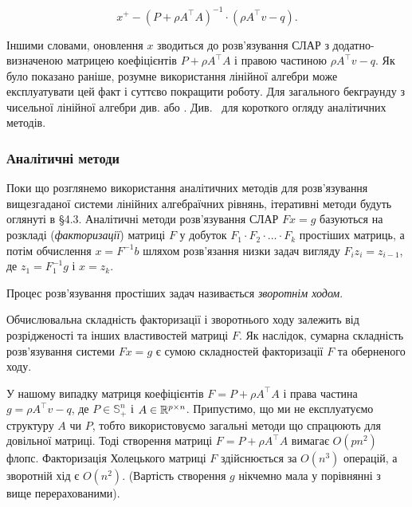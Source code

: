 \begin{equation}
	\label{eq:4.1}
	x^+ - \left(P + \rho A^\intercal A\right)^{-1} \cdot \left(\rho A^\intercal v - q\right).
\end{equation} 

Іншими словами, оновлення $x$ зводиться до розв'язування СЛАР з додатно-визначеною матрицею коефіцієнтів $P + \rho A^\intercal A$ і правою частиною $\rho A^\intercal v - q$. Як було показано раніше, розумне використання лінійної алгебри може експлуатувати цей факт і суттєво покращити роботу. Для загального бекграунду з чисельної лінійної алгебри див. \cite{47} або \cite{90}. Див.~\cite[додаток C]{20} для короткого огляду аналітичних методів.

\subsubsection{Аналітичні методи}

Поки що розглянемо використання аналітичних методів для роз\-в'яз\-у\-ван\-ня  вищезгаданої системи лінійних алгебраїчних рівнянь, ітеративні методи будуть оглянуті в \S4.3. Аналітичні методи розв'язування СЛАР $F x = g$ базуються на розкладі (\textit{факторизації}) матриці $F$ у добуток  $F_1 \cdot F_2 \cdot \ldots \cdot F_k$ простіших матриць, а потім обчислення  $x = F^{-1} b$ шляхом розв'язання низки задач вигляду $F_i z_i = z_{i - 1}$, де $z_1 = F_1^{-1} g$ і $x = z_k$. 

\begin{definition}
	Процес розв'язування простіших задач називається \textit{зворотнім ходом}.
\end{definition}

Обчислювальна складність факторизації і зворотнього ходу залежить від розрідженості та інших властивостей матриці $F$. Як наслідок, сумарна складність розв'язування системи $F x = g$ є сумою складностей факторизації $F$ та оберненого ходу. \medskip

У нашому випадку матриця коефіцієнтів $F = P + \rho A^\intercal A$ і права частина $g = \rho A^\intercal v - q$, де $P \in \mathbb{S}_+^n$ і $A \in \mathbb{R}^{p \times n}$. Припустимо, що ми не експлуатуємо структуру $A$ чи $P$, тобто використовуємо загальні методи що спрацюють для довільної матриці. Тоді створення матриці $F = P + \rho A^\intercal A$ вимагає $O\left(pn^2\right)$ флопс. Факторизація Холецького матриці $F$ здійснюється за $O\left(n^3\right)$ операцій, а зворотній хід є $O(n^2)$. \quad (Вартість створення $g$ нікчемно мала у порівнянні з вище перерахованими). \medskip

